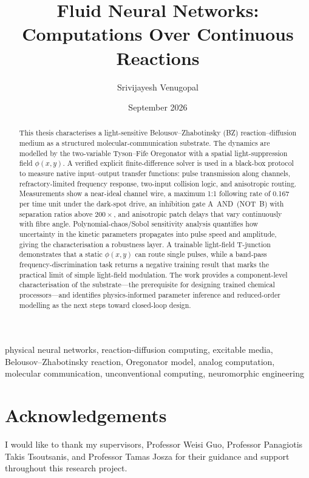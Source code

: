 \documentclass[12pt,oneside]{book}
\title{Fluid Neural Networks: Computations Over Continuous Reactions}
\author{Srivijayesh Venugopal}
\date{September 2026}
\begin{document}
\maketitle
\frontmatter

\begin{abstract}
This thesis characterises a light-sensitive Belousov--Zhabotinsky (BZ) reaction--diffusion medium as a structured molecular-communication substrate.
The dynamics are modelled by the two-variable Tyson--Fife Oregonator with a spatial light-suppression field $\phi(x,y)$.
A verified explicit finite-difference solver is used in a black-box protocol to measure native input--output transfer functions: pulse transmission along channels, refractory-limited frequency response, two-input collision logic, and anisotropic routing.
Measurements show a near-ideal channel wire, a maximum 1:1 following rate of 0.167 per time unit under the dark-spot drive, an inhibition gate A~AND~(NOT~B) with separation ratios above $200\times$, and anisotropic patch delays that vary continuously with fibre angle.
Polynomial-chaos/Sobol sensitivity analysis quantifies how uncertainty in the kinetic parameters propagates into pulse speed and amplitude, giving the characterisation a robustness layer.
A trainable light-field T-junction demonstrates that a static $\phi(x,y)$ can route single pulses, while a band-pass frequency-discrimination task returns a negative training result that marks the practical limit of simple light-field modulation.
The work provides a component-level characterisation of the substrate---the prerequisite for designing trained chemical processors---and identifies physics-informed parameter inference and reduced-order modelling as the next steps toward closed-loop design.
\end{abstract}

\begin{keywords}
physical neural networks, reaction-diffusion computing, excitable media,
Belousov--Zhabotinsky reaction, Oregonator model, analog computation,
molecular communication, unconventional computing, neuromorphic engineering
\end{keywords}

\chapter*{Acknowledgements}
I would like to thank my supervisors, Professor Weisi Guo, Professor Panagiotis Takis Tsoutsanis, and Professor Tamas Josza for their guidance and support throughout this research project.
\end{document}
